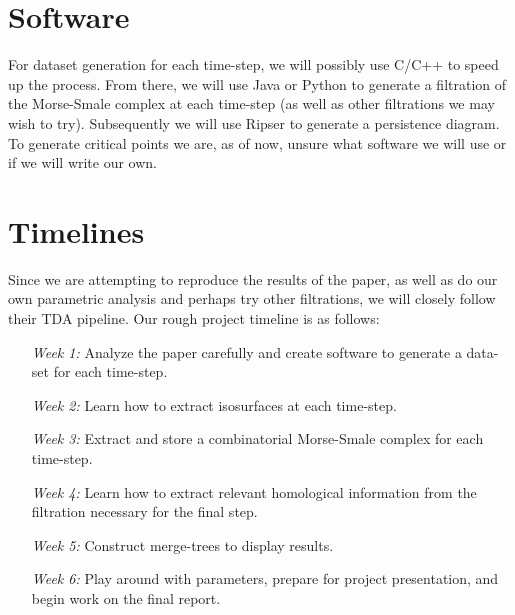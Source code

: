 \documentclass[12pt, fullpage,letterpaper]{article}
\begin{document}
	\section*{\normalfont Software}  
	
	For dataset generation for each time-step, we will possibly use C/C++ to speed up the process. From there, we will use Java or Python to generate a filtration of the Morse-Smale complex at each time-step (as well as other filtrations we may wish to try). Subsequently we will use Ripser to generate a persistence diagram. To generate critical points we are, as of now, unsure what software we will use or if we will write our own.
	
	\section*{\normalfont Timelines}  

	Since we are attempting to reproduce the results of the paper, as well as do our own parametric analysis and perhaps try other filtrations, we will closely follow their TDA pipeline. Our rough project timeline is as follows:
	\begin{enumerate}
		\item[{\textit{Week 1:}}] 
		Analyze the paper carefully and create software to generate a data-set for each time-step.
		\item[{\textit{Week 2:}}] 
		Learn how to extract isosurfaces at each time-step.
		\item[{\textit{Week 3:}}] 
		Extract and store a combinatorial Morse-Smale complex for each time-step.
		\item[{\textit{Week 4:}}] 
		Learn how to extract relevant homological information from the filtration necessary for the final step.
		\item[{\textit{Week 5:}}]  
		Construct merge-trees to display results.
		\item[{\textit{Week 6:}}] 
		Play around with parameters, prepare for project presentation, and begin work on the final report. 
	\end{enumerate}  
\end{document}
